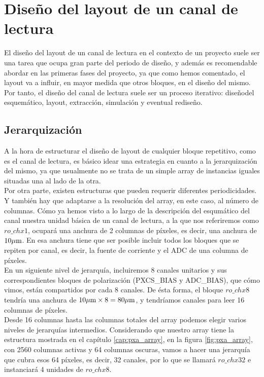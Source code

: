 \chapter{Diseño del layout de un canal de lectura}

El diseño del layout de un canal de lectura en el contexto de un proyecto suele
ser una tarea que ocupa gran parte del periodo de diseño, y además es recomendable
abordar en las primeras fases del proyecto, ya que como hemos comentado, el
layout va a influir, en mayor medida que otros bloques, en el diseño del mismo.
Por tanto, el diseño del canal de lectura suele ser un proceso iterativo:
diseñodel esquemático, layout, extracción, simulación y eventual rediseño.\\

\section{Jerarquización}

A la hora de estructurar el diseño de layout de cualquier bloque repetitivo, como
es el canal de lectura, es básico idear una estrategia en cuanto a la jerarquización
del mismo, ya que usualmente no se trata de un simple array de instancias iguales
situadas una al lado de la otra.\\

Por otra parte, existen estructuras que pueden requerir diferentes periodicidades.
Y también hay que adaptarse a la resolución del array, en este caso, al número de
columnas. Cómo ya hemos visto a lo largo de la descripción del esqumático del canal
nuestra unidad básica de un canal de lectura, a la que nos referiremos como
$ro\_chx1$, ocupará una anchura de 2 columnas de píxeles, es decir, una anchura
de $10\mu\text{m}$. En esa anchura tiene que ser posible incluir todos los bloques que
se repiten por canal, es decir, la fuente de corriente y el ADC de una columna de
píxeles.\\

En un siguiente nivel de jerarquía, incluiremos 8 canales unitarios y sus
correspondientes bloques de polarización (PXCS\_BIAS y ADC\_BIAS), que cómo vimos,
están compartidos por cada 8 canales. De ésta forma, el bloque $ro\_chx8$
tendría una anchura de $10\mu\text{m} \times 8 = 80\mu\text{m}$, y tendríamos canales para
leer 16 columnas de píxeles.\\

Desde 16 columnas hasta las columnas totales del array podemos elegir varios niveles
de jerarquías intermedios. Considerando que nuestro array tiene la estructura
mostrada en el capítulo \ref{cap:pxa_array}, en la figura \ref{fig:pxa_array},
con 2560 columnas activas y 64 columnas oscuras, vamos a hacer una jerarquía que
cubra esos 64 píxeles, es decir, 32 canales, por lo que se llamará $ro\_chx32$ e
instanciará 4 unidades de $ro\_chx8$.\\

